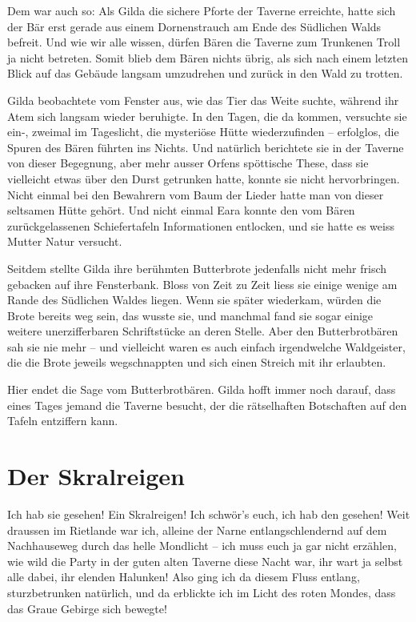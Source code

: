Dem war auch so: Als Gilda die sichere Pforte der Taverne erreichte, hatte sich der Bär erst gerade aus einem Dornenstrauch am Ende des Südlichen Walds befreit. Und wie wir alle wissen, dürfen Bären die Taverne zum Trunkenen Troll ja nicht betreten. Somit blieb dem Bären nichts übrig, als sich nach einem letzten Blick auf das Gebäude langsam umzudrehen und zurück in den Wald zu trotten.

Gilda beobachtete vom Fenster aus, wie das Tier das Weite suchte, während ihr Atem sich langsam wieder beruhigte. In den Tagen, die da kommen, versuchte sie ein-, zweimal im Tageslicht, die mysteriöse Hütte wiederzufinden – erfolglos, die Spuren des Bären führten ins Nichts. Und natürlich berichtete sie in der Taverne von dieser Begegnung, aber mehr ausser Orfens spöttische These, dass sie vielleicht etwas über den Durst getrunken hatte, konnte sie nicht hervorbringen. Nicht einmal bei den Bewahrern vom Baum der Lieder hatte man von dieser seltsamen Hütte gehört. Und nicht einmal Eara konnte den vom Bären zurückgelassenen Schiefertafeln Informationen entlocken, und sie hatte es weiss Mutter Natur versucht.

Seitdem stellte Gilda ihre berühmten Butterbrote jedenfalls nicht mehr frisch gebacken auf ihre Fensterbank. Bloss von Zeit zu Zeit liess sie einige wenige am Rande des Südlichen Waldes liegen. Wenn sie später wiederkam, würden die Brote bereits weg sein, das wusste sie, und manchmal fand sie sogar einige weitere unerzifferbaren Schriftstücke an deren Stelle. Aber den Butterbrotbären sah sie nie mehr – und vielleicht waren es auch einfach irgendwelche Waldgeister, die die Brote jeweils wegschnappten und sich einen Streich mit ihr erlaubten.

Hier endet die Sage vom Butterbrotbären. Gilda hofft immer noch darauf, dass eines Tages jemand die Taverne besucht, der die rätselhaften Botschaften auf den Tafeln entziffern kann.



\newpage
\section{Der Skralreigen}


Ich hab sie gesehen! Ein Skralreigen! Ich schwör’s euch, ich hab den gesehen! Weit draussen im Rietlande war ich, alleine der Narne entlangschlendernd auf dem Nachhauseweg durch das helle Mondlicht – ich muss euch ja gar nicht erzählen, wie wild die Party in der guten alten Taverne diese Nacht war, ihr wart ja selbst alle dabei, ihr elenden Halunken! Also ging ich da diesem Fluss entlang, sturzbetrunken natürlich, und da erblickte ich im Licht des roten Mondes, dass das Graue Gebirge sich bewegte!

